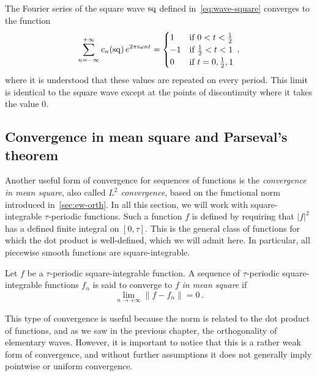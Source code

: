 \begin{example}
	The Fourier series of the square wave $\operatorname{sq}$ defined in~\cref{eq:wave-square} converges
	to the function
	\begin{equation}
		\sum_{n=-\infty}^{+\infty}c_n(\operatorname{sq})\,e^{2\pi i \omega nt}=
		\begin{cases}
			1  & \text{if}~0<t<\frac{1}{2}   \\
			-1 & \text{if}~\frac{1}{2}<t<1   \\
			0  & \text{if}~t=0,\frac{1}{2},1
		\end{cases}\,,
	\end{equation}
	where it is understood that these values are repeated on every period. This limit is
	identical to the square wave except at the points of discontinuity where it takes the
	value $0$.
\end{example}
\subsection{Convergence in mean square and Parseval's theorem}
\label{sec:series-l2-conv}
Another useful form of convergence for sequences of functions is the \emph{convergence in
	mean square}, also called \emph{$L^2$ convergence}, based on the functional norm
introduced in~\cref{sec:ew-orth}. In all this section, we will work with square-integrable
$\tau$-periodic functions. Such a function $f$ is defined by requiring that $|f|^2$ has a
defined finite integral on $[0,\tau]$. This is the general class of functions for which
the dot product is well-defined, which we will admit here. In particular, all piecewise
smooth functions are square-integrable.
\begin{definition}
	Let $f$ be a $\tau$-periodic square-integrable function. A sequence of $\tau$-periodic
	square-integrable functions $f_n$ is said to converge to $f$ \emph{in mean square} if
	\begin{equation}
		\lim_{n\to+\infty}\|f-f_n\|=0\,.
	\end{equation}
\end{definition}
This type of convergence is useful because the norm is related to the dot product of
functions, and as we saw in the previous chapter, the orthogonality of elementary waves.
However, it is important to notice that this is a rather weak form of convergence, and
without further assumptions it does not generally imply pointwise or uniform convergence.

